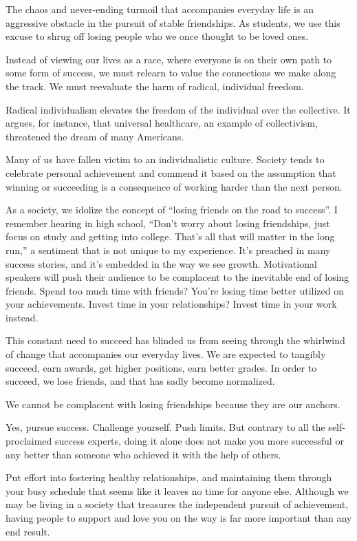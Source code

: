 \documentclass[UTF8,11pt]{ctexart}
\begin{document}
The chaos and never-ending turmoil that accompanies everyday life is an aggressive obstacle in the pursuit of stable friendships. As students, we use this excuse to shrug off losing people who we once thought to be loved ones.


Instead of viewing our lives as a race, where everyone is on their own path to some form of success, we must relearn to value the connections we make along the track. We must reevaluate the harm of radical, individual freedom.


Radical individualism elevates the freedom of the individual over the collective. It argues, for instance, that universal healthcare, an example of collectivism, threatened the dream of many Americans.


Many of us have fallen victim to an individualistic culture. Society tends to celebrate personal achievement and commend it based on the assumption that winning or succeeding is a consequence of working harder than the next person.


As a society, we idolize the concept of “losing friends on the road to success”. I remember hearing in high school, “Don’t worry about losing friendships, just focus on study and getting into college. That’s all that will matter in the long run,” a sentiment that is not unique to my experience. It’s preached in many success stories, and it’s embedded in the way we see growth. Motivational speakers will push their audience to be complacent to the inevitable end of losing friends. Spend too much time with friends? You’re losing time better utilized on your achievements. Invest time in your relationships? Invest time in your work instead.


This constant need to succeed has blinded us from seeing through the whirlwind of change that accompanies our everyday lives. We are expected to tangibly succeed, earn awards, get higher positions, earn better grades. In order to succeed, we lose friends, and that has sadly become normalized.


We cannot be complacent with losing friendships because they are our anchors.


Yes, pursue success. Challenge yourself. Push limits. But contrary to all the self-proclaimed success experts, doing it alone does not make you more successful or any better than someone who achieved it with the help of others.


Put effort into fostering healthy relationships, and maintaining them through your busy schedule that seems like it leaves no time for anyone else. Although we may be living in a society that treasures the independent pursuit of achievement, having people to support and love you on the way is far more important than any end result.
\end{document}
